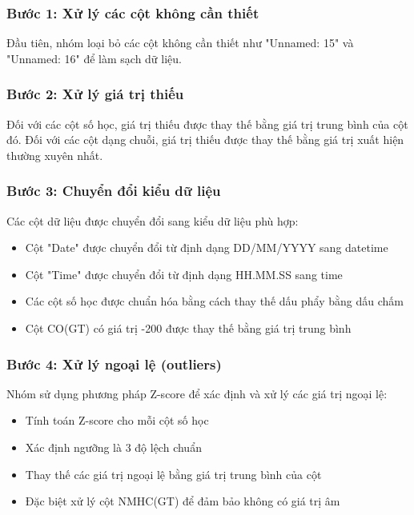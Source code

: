 \subsubsection{Bước 1: Xử lý các cột không cần thiết}
\hspace{0.5cm}Đầu tiên, nhóm loại bỏ các cột không cần thiết như "Unnamed: 15" và "Unnamed: 16" để làm sạch dữ liệu.

\subsubsection{Bước 2: Xử lý giá trị thiếu}
\hspace{0.5cm}Đối với các cột số học, giá trị thiếu được thay thế bằng giá trị trung bình của cột đó. Đối với các cột dạng chuỗi, giá trị thiếu được thay thế bằng giá trị xuất hiện thường xuyên nhất.

\subsubsection{Bước 3: Chuyển đổi kiểu dữ liệu}
\hspace{0.5cm}Các cột dữ liệu được chuyển đổi sang kiểu dữ liệu phù hợp:
\begin{itemize}
    \item Cột "Date" được chuyển đổi từ định dạng DD/MM/YYYY sang datetime
    \item Cột "Time" được chuyển đổi từ định dạng HH.MM.SS sang time
    \item Các cột số học được chuẩn hóa bằng cách thay thế dấu phẩy bằng dấu chấm
    \item Cột CO(GT) có giá trị -200 được thay thế bằng giá trị trung bình
\end{itemize}

\subsubsection{Bước 4: Xử lý ngoại lệ (outliers)}
\hspace{0.5cm}Nhóm sử dụng phương pháp Z-score để xác định và xử lý các giá trị ngoại lệ:
\begin{itemize}
    \item Tính toán Z-score cho mỗi cột số học
    \item Xác định ngưỡng là 3 độ lệch chuẩn
    \item Thay thế các giá trị ngoại lệ bằng giá trị trung bình của cột
    \item Đặc biệt xử lý cột NMHC(GT) để đảm bảo không có giá trị âm
\end{itemize}

